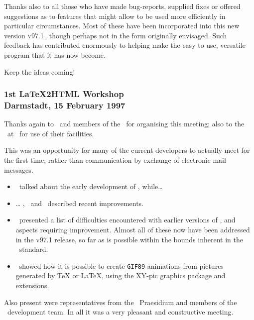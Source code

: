 \medskip\vfil\htmlrule\bigskip\noindent
Thanks also to all those who have made bug-reports, supplied fixes 
or offered suggestions as to features that might allow \latextohtml{} 
to be used more efficiently in particular circumstances. 
Most of these have been incorporated into this new version \textsc{v97.1}\,,
though perhaps not in the form originally envisaged.
Such feedback has contributed enormously to helping make \latextohtml{} the
easy to use, versatile program that it has now become.

\bigskip
\begin{center}
Keep the ideas coming!
\end{center}
\bigskip
\vfil




\subsubsection*[center]{1st \LaTeX2HTML{} Workshop\\Darmstadt, 
15 February 1997\label{darmstadt}}
Thanks again to \Lippmann\ and members of the \LiPS\ for organising this meeting; 
also to the \FIDarmstadt\ at \Darmstadt\ for use of their facilities.

\noindent
This was an opportunity for many of the current \latextohtml{} developers to
actually meet for the first time; rather than communication by exchange
of electronic mail messages.
%
\begin{itemize}
\item
\NikosDrakos\ talked about the early development of \latextohtml, while\dots
\item \dots
\RossMoore, \Lippmann\ and \Rouchal\ described recent improvements. 
\item
\Goossens\ presented a list of difficulties encountered with earlier
versions of \latextohtml{}, and aspects requiring improvement.
Almost all of these now have been addressed in the \textsc{v97.1} release,
so far as is possible within the bounds inherent in the \HTMLiii\ standard.
\item
\KrisRose\ showed how it is possible to create \texttt{GIF89} animations 
from pictures generated by \TeX{} or \LaTeX{}, using the XY-pic graphics 
package and extensions.
\end{itemize}

\noindent
Also present were representatives from the \DANTE\ Praesidium and 
members of the \LaTeXiii\ development team.\html{\\} 
In all it was a very pleasant and constructive meeting.

